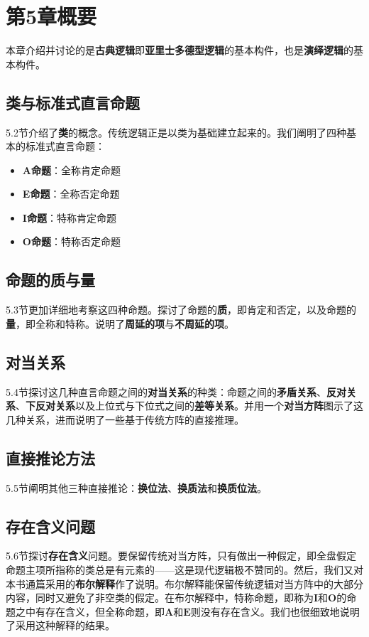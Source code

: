 \section{第5章概要}
本章介绍并讨论的是\textbf{古典逻辑}即\textbf{亚里士多德型逻辑}的基本构件，也是\textbf{演绎逻辑}的基本构件。

\subsection{类与标准式直言命题}
5.2节介绍了\textbf{类}的概念。传统逻辑正是以类为基础建立起来的。我们阐明了四种基本的标准式直言命题：

\begin{itemize}
  \item \textbf{A命题}：全称肯定命题
  \item \textbf{E命题}：全称否定命题
  \item \textbf{I命题}：特称肯定命题
  \item \textbf{O命题}：特称否定命题
\end{itemize}

\subsection{命题的质与量}
5.3节更加详细地考察这四种命题。探讨了命题的\textbf{质}，即肯定和否定，以及命题的\textbf{量}，即全称和特称。说明了\textbf{周延的项}与\textbf{不周延的项}。

\subsection{对当关系}
5.4节探讨这几种直言命题之间的\textbf{对当关系}的种类：命题之间的\textbf{矛盾关系}、\textbf{反对关系}、\textbf{下反对关系}以及上位式与下位式之间的\textbf{差等关系}。并用一个\textbf{对当方阵}图示了这几种关系，进而说明了一些基于传统方阵的直接推理。

\subsection{直接推论方法}
5.5节阐明其他三种直接推论：\textbf{换位法}、\textbf{换质法}和\textbf{换质位法}。

\subsection{存在含义问题}
5.6节探讨\textbf{存在含义}问题。要保留传统对当方阵，只有做出一种假定，即全盘假定命题主项所指称的类总是有元素的——这是现代逻辑极不赞同的。然后，我们又对本书通篇采用的\textbf{布尔解释}作了说明。布尔解释能保留传统逻辑对当方阵中的大部分内容，同时又避免了非空类的假定。在布尔解释中，特称命题，即称为$\mathbf{I}$和$\mathbf{O}$的命题之中有存在含义，但全称命题，即$\mathbf{A}$和$\mathbf{E}$则没有存在含义。我们也很细致地说明了采用这种解释的结果。

